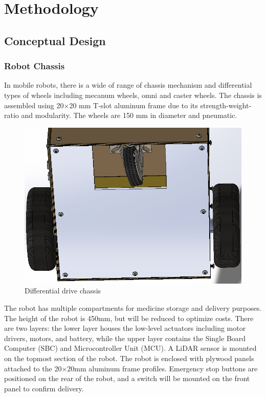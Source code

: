 \newpage

\section{Methodology}

\subsection{Conceptual Design}

\subsubsection{Robot Chassis}
In mobile robots, there is a wide of range of chassis mechanism and differential types of wheels including mecanum wheels, omni and caster wheels.
The chassis is assembled using 20$\times$20 mm T-slot aluminum frame due to its strength-weight-ratio and modularity. The wheels are 150 mm in diameter
and pneumatic.

\begin{figure}[H]
    \centering
    \includegraphics[width=5.5in]{pics/diff.png} 
    \caption{Differential drive chassis}\label{diff_cart}
\end{figure}

\noindent The robot has multiple compartments for medicine storage and delivery purposes. The height of the robot is 450mm, but will be reduced to
optimize costs. There are two layers: the lower layer houses the low-level actuators including motor drivers, motors, and battery,
while the upper layer contains the Single Board Computer (SBC) and Microcontroller Unit (MCU). A LiDAR sensor is mounted on the topmost 
section of the robot. The robot is enclosed with plywood panels attached to the 20$\times$20mm aluminum frame profiles. Emergency
stop buttons are positioned on the rear of the robot, and a switch will be mounted on the front panel to confirm delivery.

